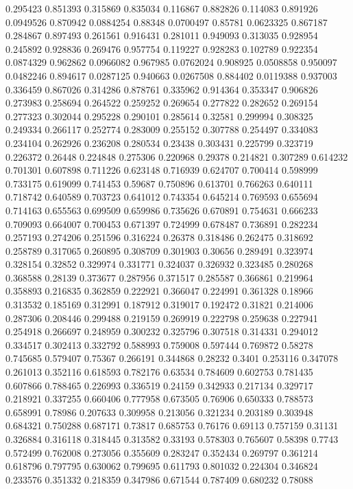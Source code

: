 0.295423 0.851393
0.315869 0.835034
0.116867 0.882826
0.114083 0.891926
0.0949526 0.870942
0.0884254 0.88348
0.0700497 0.85781
0.0623325 0.867187
0.284867 0.897493
0.261561 0.916431
0.281011 0.949093
0.313035 0.928954
0.245892 0.928836
0.269476 0.957754
0.119227 0.928283
0.102789 0.922354
0.0874329 0.962862
0.0966082 0.967985
0.0762024 0.908925
0.0508858 0.950097
0.0482246 0.894617
0.0287125 0.940663
0.0267508 0.884402
0.0119388 0.937003
0.336459 0.867026
0.314286 0.878761
0.335962 0.914364
0.353347 0.906826
0.273983 0.258694
0.264522 0.259252
0.269654 0.277822
0.282652 0.269154
0.277323 0.302044
0.295228 0.290101
0.285614 0.32581
0.299994 0.308325
0.249334 0.266117
0.252774 0.283009
0.255152 0.307788
0.254497 0.334083
0.234104 0.262926
0.236208 0.280534
0.23438 0.303431
0.225799 0.323719
0.226372 0.26448
0.224848 0.275306
0.220968 0.29378
0.214821 0.307289
0.614232 0.701301
0.607898 0.711226
0.623148 0.716939
0.624707 0.700414
0.598999 0.733175
0.619099 0.741453
0.59687 0.750896
0.613701 0.766263
0.640111 0.718742
0.640589 0.703723
0.641012 0.743354
0.645214 0.769593
0.655694 0.714163
0.655563 0.699509
0.659986 0.735626
0.670891 0.754631
0.666233 0.709093
0.664007 0.700453
0.671397 0.724999
0.678487 0.736891
0.282234 0.257193
0.274206 0.251596
0.316224 0.26378
0.318486 0.262475
0.318692 0.258789
0.317065 0.260895
0.308709 0.301903
0.30656 0.289491
0.323974 0.328154
0.32852 0.329974
0.331771 0.324037
0.326932 0.323485
0.280268 0.368588
0.28139 0.373677
0.287956 0.371517
0.285587 0.366861
0.219964 0.358893
0.216835 0.362859
0.222921 0.366047
0.224991 0.361328
0.18966 0.313532
0.185169 0.312991
0.187912 0.319017
0.192472 0.31821
0.214006 0.287306
0.208446 0.299488
0.219159 0.269919
0.222798 0.259638
0.227941 0.254918
0.266697 0.248959
0.300232 0.325796
0.307518 0.314331
0.294012 0.334517
0.302413 0.332792
0.588993 0.759008
0.597444 0.769872
0.58278 0.745685
0.579407 0.75367
0.266191 0.344868
0.28232 0.3401
0.253116 0.347078
0.261013 0.352116
0.618593 0.782176
0.63534 0.784609
0.602753 0.781435
0.607866 0.788465
0.226993 0.336519
0.24159 0.342933
0.217134 0.329717
0.218921 0.337255
0.660406 0.777958
0.673505 0.76906
0.650333 0.788573
0.658991 0.78986
0.207633 0.309958
0.213056 0.321234
0.203189 0.303948
0.684321 0.750288
0.687171 0.73817
0.685753 0.76176
0.69113 0.757159
0.31131 0.326884
0.316118 0.318445
0.313582 0.33193
0.578303 0.765607
0.58398 0.7743
0.572499 0.762008
0.273056 0.355609
0.283247 0.352434
0.269797 0.361214
0.618796 0.797795
0.630062 0.799695
0.611793 0.801032
0.224304 0.346824
0.233576 0.351332
0.218359 0.347986
0.671544 0.787409
0.680232 0.78088
